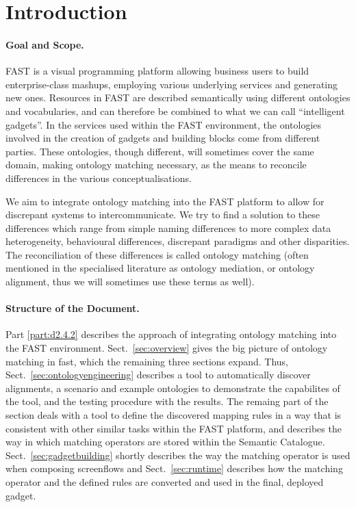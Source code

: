 \documentclass{fast_latex}
\begin{document}
\section{Introduction} %
\label{sec:intro}
\paragraph{Goal and Scope.}
FAST is a visual programming platform allowing business users to build enterprise-class mashups, employing various underlying services and generating new ones. Resources in FAST are described semantically using different ontologies and vocabularies, and can therefore be combined to what we can call ``intelligent gadgets''. In the services used within the FAST environment, the ontologies involved in the creation of gadgets and building blocks come from different parties. These ontologies, though different, will sometimes cover the same domain, making ontology matching necessary, as the means to reconcile differences in the various conceptualisations.

We aim to integrate ontology matching into the FAST platform to allow for discrepant systems to intercommunicate.  We try to find a solution to these differences which range from simple naming differences to more complex data heterogeneity, behavioural differences, discrepant paradigms and other disparities. The reconciliation of these differences is called ontology matching (often mentioned in the specialised literature as ontology mediation, or ontology alignment, thus we will sometimes use these terms as well). 

\paragraph{Structure of the Document.}
Part \ref{part:d2.4.2} describes the approach of integrating ontology matching into the FAST environment. Sect.~\ref{sec:overview} gives the big picture of ontology matching in fast, which the remaining three sections expand. Thus, Sect.~\ref{sec:ontologyengineering} describes a tool to automatically discover alignments, a scenario and example ontologies to demonstrate the capabilites of the tool, and the testing procedure with the results.  The remaing part of the section deals with a tool to define the discovered mapping rules in a way that is consistent with other similar tasks within the FAST platform, and describes the way in which matching operators are stored within the Semantic Catalogue. Sect.~\ref{sec:gadgetbuilding} shortly describes the way the matching operator is used when composing screenflows and Sect.~\ref{sec:runtime} describes how the matching operator and the defined rules are converted and used in the final, deployed gadget.
\end{document}
